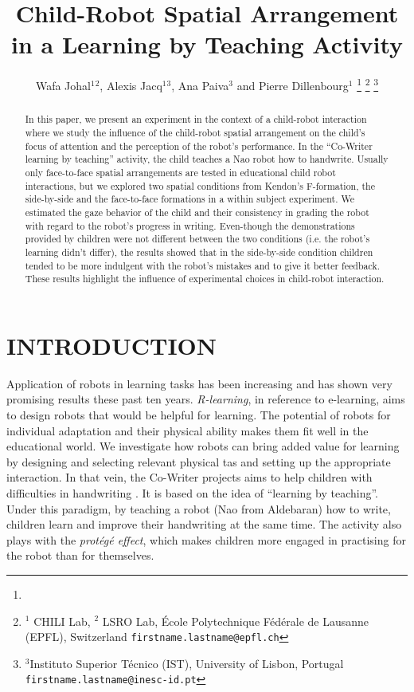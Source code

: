 \documentclass[letterpaper, 10 pt, conference]{ieeeconf}  %
\title{\LARGE \bf
Child-Robot Spatial Arrangement in a Learning by Teaching Activity}
\author{Wafa Johal$^{1}$$^{2}$, Alexis Jacq$^{1}$$^{3}$, Ana Paiva$^{3}$ and Pierre Dillenbourg$^{1}$  %
\thanks{}%
\thanks{$^{1}$ CHILI Lab,
	$^{2}$ LSRO Lab,
        \'{E}cole Polytechnique F\'{e}d\'{e}rale de Lausanne (EPFL), Switzerland
        {\tt\small firstname.lastname@epfl.ch}}%
\thanks{$^{3}$Instituto Superior T\'{e}cnico (IST), University of Lisbon, Portugal
        {\tt\small firstname.lastname@inesc-id.pt}}%
}
\begin{document}
\maketitle


\begin{abstract}
In this paper, we present an experiment in the context of a child-robot interaction where we study the influence of the child-robot spatial arrangement on the child's focus of attention and the perception of the robot's performance. In the ``Co-Writer learning by teaching'' activity, the child teaches a Nao robot how to handwrite.
Usually only face-to-face spatial arrangements are tested in educational child robot interactions, but we explored two spatial conditions from Kendon's F-formation, the side-by-side and the face-to-face formations in a within subject experiment.
We estimated the gaze behavior of the child and their consistency in grading the robot with regard to the robot's progress in writing. 
Even-though the demonstrations provided by children were not different between the two conditions (i.e. the robot's learning didn't differ),  the results showed that in the side-by-side condition children tended to be more indulgent with the robot's mistakes and to give it better feedback.
These results highlight the influence of experimental choices in child-robot interaction.
\end{abstract}


\section{INTRODUCTION}

Application of robots in learning tasks has been increasing and has shown very promising results these past ten years. 
\emph{R-learning}, in reference to e-learning, aims to design robots that would be helpful for learning.
The potential of robots for individual adaptation and their physical ability makes them fit well in the educational world.
We investigate how robots can bring added value for learning by designing and selecting relevant physical tas and setting up the appropriate interaction.
In that vein, the Co-Writer projects aims to help children with difficulties in handwriting \cite{hood2015when}.
It is based on the idea of ``learning by teaching''.
Under this paradigm, by teaching a robot (Nao from Aldebaran) how to write, children learn and improve their handwriting at the same time.
The activity also plays with the \emph{protégé effect}, which makes children more engaged in practising for the robot than for themselves.
\end{document}
